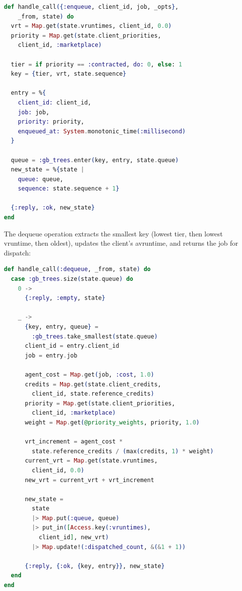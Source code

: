 \documentclass[12pt,a4paper]{article}
\theoremstyle{definition}
\theoremstyle{remark}
\begin{document}
\begin{lstlisting}[language=elixir, caption={Enqueue with composite sort key (from \texttt{scheduler.ex})}, label={lst:enqueue}]
def handle_call({:enqueue, client_id, job, _opts},
    _from, state) do
  vrt = Map.get(state.vruntimes, client_id, 0.0)
  priority = Map.get(state.client_priorities,
    client_id, :marketplace)

  tier = if priority == :contracted, do: 0, else: 1
  key = {tier, vrt, state.sequence}

  entry = %{
    client_id: client_id,
    job: job,
    priority: priority,
    enqueued_at: System.monotonic_time(:millisecond)
  }

  queue = :gb_trees.enter(key, entry, state.queue)
  new_state = %{state |
    queue: queue,
    sequence: state.sequence + 1}

  {:reply, :ok, new_state}
end
\end{lstlisting}

The dequeue operation extracts the smallest key (lowest tier, then lowest vruntime, then oldest), updates the client's avruntime, and returns the job for dispatch:

\begin{lstlisting}[language=elixir, caption={Dequeue with avruntime update (from \texttt{scheduler.ex})}, label={lst:dequeue}]
def handle_call(:dequeue, _from, state) do
  case :gb_trees.size(state.queue) do
    0 ->
      {:reply, :empty, state}

    _ ->
      {key, entry, queue} =
        :gb_trees.take_smallest(state.queue)
      client_id = entry.client_id
      job = entry.job

      agent_cost = Map.get(job, :cost, 1.0)
      credits = Map.get(state.client_credits,
        client_id, state.reference_credits)
      priority = Map.get(state.client_priorities,
        client_id, :marketplace)
      weight = Map.get(@priority_weights, priority, 1.0)

      vrt_increment = agent_cost *
        state.reference_credits / (max(credits, 1) * weight)
      current_vrt = Map.get(state.vruntimes,
        client_id, 0.0)
      new_vrt = current_vrt + vrt_increment

      new_state =
        state
        |> Map.put(:queue, queue)
        |> put_in([Access.key(:vruntimes),
          client_id], new_vrt)
        |> Map.update!(:dispatched_count, &(&1 + 1))

      {:reply, {:ok, {key, entry}}, new_state}
  end
end
\end{lstlisting}
\end{document}
